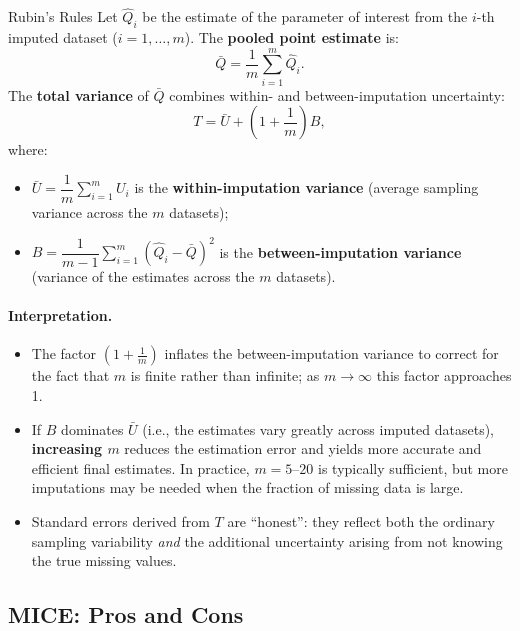 \documentclass[11pt]{article}
\theoremstyle{smallexample}
\begin{document}
 \begin{defbox}{Rubin's Rules}
  Let $\hat{Q}_i$ be the estimate of the parameter of interest from the $i$-th
  imputed dataset ($i = 1, \ldots, m$). The \textbf{pooled point estimate} is:
  \[
   \bar{Q} = \frac{1}{m} \sum_{i=1}^{m} \hat{Q}_i.
  \]
  The \textbf{total variance} of $\bar{Q}$ combines within- and between-imputation
  uncertainty:
  \[
   T = \bar{U} + \left(1 + \frac{1}{m}\right) B,
  \]
  where:
  \begin{itemize}
   \item $\bar{U} = \dfrac{1}{m}\displaystyle\sum_{i=1}^{m} U_i$ is the
     \textbf{within-imputation variance} (average sampling variance across the $m$
     datasets);
   \item $B = \dfrac{1}{m-1}\displaystyle\sum_{i=1}^{m}(\hat{Q}_i - \bar{Q})^2$
     is the \textbf{between-imputation variance} (variance of the estimates across
     the $m$ datasets).
  \end{itemize}
 \end{defbox}

\paragraph{Interpretation.}
 \begin{itemize}
  \item The factor $\left(1 + \tfrac{1}{m}\right)$ inflates the between-imputation
    variance to correct for the fact that $m$ is finite rather than infinite; as
    $m \to \infty$ this factor approaches 1.

  \vspace{0.2cm}
  \item If $B$ dominates $\bar{U}$ (i.e., the estimates vary greatly across imputed
    datasets), \textbf{increasing $m$} reduces the estimation error and yields more
    accurate and efficient final estimates. In practice, $m = 5$–$20$ is typically
    sufficient, but more imputations may be needed when the fraction of missing data
    is large.

  \vspace{0.2cm}
  \item Standard errors derived from $T$ are ``honest'': they reflect both the
    ordinary sampling variability \emph{and} the additional uncertainty arising from
    not knowing the true missing values.
 \end{itemize}

\subsection{MICE: Pros and Cons}
\end{document}
